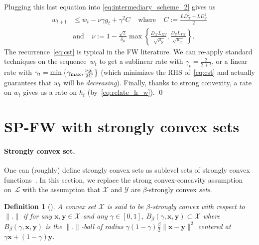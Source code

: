 \documentclass[twoside]{article}
\renewcommand{\L}{\mathcal{L}}
\newcommand{\X}{\mathcal{X}}
\newcommand{\Y}{\mathcal{Y}}
\newcommand{\x}{\bm{x}}
\newcommand{\y}{\bm{y}}
\newcommand{\CondNumb}{\nu}
\newtheorem{definition}{Definition}
\newcommand{\stepsize}{\gamma}
\newcommand{\stepmax}{\stepsize_{\textnormal{\scriptsize max}}} %
\newcommand{\0}{\mathbf{0}} %
\begin{document}
%
%
%
%
%
%
%
%
%
%
%
%
Plugging this last equation into \eqref{eq:intermediary_scheme_2} gives us 
\begingroup
\setlength{\thinmuskip}{2mu}
\setlength{\medmuskip}{2mu}
\setlength{\thickmuskip}{2mu}
\begin{equation}
\begin{aligned}\label{eq:cst}
    w_{t+1} & \leq w_t 
                  - \CondNumb\stepsize g_t 
                  + \stepsize^2 {C}
                  \;\;\;\; \text{where} \;\;\;\;  C := \tfrac{ L D_\X^2+ L D_\Y^2}{2}
                  \\
    &\text{and}  \;\;\;\; \CondNumb  := 1-  \tfrac{\sqrt{2}}{\delta_\mu}\max\left\{ \tfrac{D_\X L_{XY}}{\sqrt{\mu_\Y}}, \tfrac{D_\Y L_{YX}}{\sqrt{\mu_\X}}\right\}.
\end{aligned} 
\end{equation}
 \endgroup
%
The recurrence~\eqref{eq:cst} is typical in the FW literature. We can re-apply standard techniques on the sequence~$w_t$ to get a sublinear rate with $\stepsize_t = \frac{2}{2+t}$, or a linear rate with $\stepsize_t= \min\left\{ \stepmax, \frac{\CondNumb g_t}{2C} \right\}$ (which minimizes the RHS of~\eqref{eq:cst} and actually guarantees that $w_t$ will be \emph{decreasing}). Finally, thanks to strong convexity, a rate on $w_t$ gives us a rate on $h_t$ (by~\eqref{eq:relate_h_w}). \qed
%
%
%






%






%
%
%


%
%

\section{SP-FW with strongly convex sets}
\label{sec:strongly_set}
  \paragraph{Strongly convex set.} %
  \label{par:strongly_convex_set}
  One can (roughly) define strongly convex sets as sublevel sets of strongly convex functions~\citep[Prop.~4.14]{vial1983strong}. In this section, we replace the strong convex-concavity assumption on~$\L$ with the assumption that $\X$ and $\Y$ are $\beta$-strongly convex \emph{sets}.
  \begin{definition}[\citet{vial1983strong,polyak1966existence}]\label{def:strong_set}
    A convex set $\X$ is said to be $\beta$-strongly convex with respect to~$\|.\|$ 
    if for any $\x,\y \in \X$ and any $\gamma \in [0,1]$, $B_\beta(\gamma,\x,\y) \subset \X$ where $B_\beta(\gamma,\x,\y)$ is the $\|.\|$-ball of radius ${\gamma(1 - \gamma) \frac{\beta}{2}\|\x-\y\|^2}$ centered at $\gamma \x + (1- \gamma)\y$.
  \end{definition}
\end{document}
